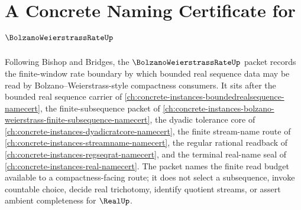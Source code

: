 \chapter{A Concrete Naming Certificate for $\BolzanoWeierstrassRateUp$}
\label{ch:concrete-instances-bolzano-weierstrass-rate-namecert}

Following Bishop and Bridges, the $\BolzanoWeierstrassRateUp$ packet records the finite-window rate boundary by which bounded real sequence data may be read by Bolzano--Weierstrass-style compactness consumers. It sits after the bounded real sequence carrier of \autoref{ch:concrete-instances-boundedrealsequence-namecert}, the finite-subsequence packet of \autoref{ch:concrete-instances-bolzano-weierstrass-finite-subsequence-namecert}, the dyadic tolerance core of \autoref{ch:concrete-instances-dyadicratcore-namecert}, the finite stream-name route of \autoref{ch:concrete-instances-streamname-namecert}, the regular rational readback of \autoref{ch:concrete-instances-regseqrat-namecert}, and the terminal real-name seal of \autoref{ch:concrete-instances-real-namecert}. The packet names the finite read budget available to a compactness-facing route; it does not select a subsequence, invoke countable choice, decide real trichotomy, identify quotient streams, or assert ambient completeness for $\RealUp$.

